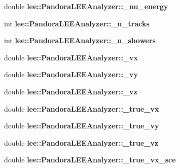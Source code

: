 \begin{DoxyCompactItemize}
\item 
\hypertarget{group__lee_ga23ee0dccbe8495fa418cb6c0020c1643}{double {\bfseries lee\-::\-Pandora\-L\-E\-E\-Analyzer\-::\-\_\-nu\-\_\-energy}}\label{group__lee_ga23ee0dccbe8495fa418cb6c0020c1643}

\item 
\hypertarget{group__lee_ga023bb8e8a12ac261583b6d71fd1c12e2}{int {\bfseries lee\-::\-Pandora\-L\-E\-E\-Analyzer\-::\-\_\-n\-\_\-tracks}}\label{group__lee_ga023bb8e8a12ac261583b6d71fd1c12e2}

\item 
\hypertarget{group__lee_ga18da3a91fd8778add6fbd0c4e2244f89}{int {\bfseries lee\-::\-Pandora\-L\-E\-E\-Analyzer\-::\-\_\-n\-\_\-showers}}\label{group__lee_ga18da3a91fd8778add6fbd0c4e2244f89}

\item 
\hypertarget{group__lee_ga440e3b5b58670672f25f42dd09d0aa21}{double {\bfseries lee\-::\-Pandora\-L\-E\-E\-Analyzer\-::\-\_\-vx}}\label{group__lee_ga440e3b5b58670672f25f42dd09d0aa21}

\item 
\hypertarget{group__lee_gabbf5b67c1538e2771ba997ddd41c9341}{double {\bfseries lee\-::\-Pandora\-L\-E\-E\-Analyzer\-::\-\_\-vy}}\label{group__lee_gabbf5b67c1538e2771ba997ddd41c9341}

\item 
\hypertarget{group__lee_ga640cb654c98033c9294cb1fda9f86b89}{double {\bfseries lee\-::\-Pandora\-L\-E\-E\-Analyzer\-::\-\_\-vz}}\label{group__lee_ga640cb654c98033c9294cb1fda9f86b89}

\item 
\hypertarget{group__lee_ga537783c86380bbaf3357e3633f07ed7f}{double {\bfseries lee\-::\-Pandora\-L\-E\-E\-Analyzer\-::\-\_\-true\-\_\-vx}}\label{group__lee_ga537783c86380bbaf3357e3633f07ed7f}

\item 
\hypertarget{group__lee_gac8bd6c7a1c52045790f54232855c1073}{double {\bfseries lee\-::\-Pandora\-L\-E\-E\-Analyzer\-::\-\_\-true\-\_\-vy}}\label{group__lee_gac8bd6c7a1c52045790f54232855c1073}

\item 
\hypertarget{group__lee_gab2c80253d7af767bc7435a95b714d546}{double {\bfseries lee\-::\-Pandora\-L\-E\-E\-Analyzer\-::\-\_\-true\-\_\-vz}}\label{group__lee_gab2c80253d7af767bc7435a95b714d546}

\item 
\hypertarget{group__lee_ga8a638838ed9a1cde42fd00a198c3521b}{double {\bfseries lee\-::\-Pandora\-L\-E\-E\-Analyzer\-::\-\_\-true\-\_\-vx\-\_\-sce}}\label{group__lee_ga8a638838ed9a1cde42fd00a198c3521b}


\end{DoxyCompactItemize}
